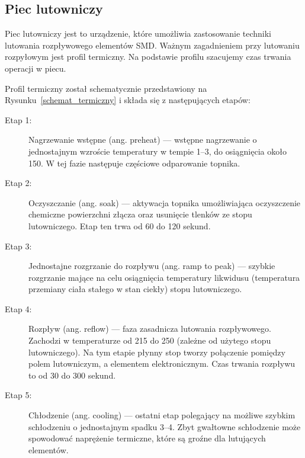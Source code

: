 \subsection{Piec lutowniczy}
Piec lutowniczy jest to urządzenie, które umożliwia zastosowanie techniki lutowania rozpływowego elementów SMD\@. Ważnym zagadnieniem przy lutowaniu rozpyłowym jest profil termiczny. Na podstawie profilu szacujemy czas trwania operacji w piecu.

\breakparagraph{}
Profil termiczny został schematycznie przedstawiony na Rysunku~\ref{schemat_termiczny} i składa się z następujących etapów:
\begin{description}
	\item[Etap 1:] Nagrzewanie wstępne (ang. preheat) --- wstępne nagrzewanie o jednostajnym wzroście temperatury w tempie 1--3, do osiągnięcia około 150. W tej fazie następuje częściowe odparowanie topnika.
	\item[Etap 2:] Oczyszczanie (ang. soak) --- aktywacja topnika umożliwiająca oczyszczenie chemiczne powierzchni złącza oraz usunięcie tlenków ze stopu lutowniczego. Etap ten trwa od 60 do 120 sekund.
	\item[Etap 3:] Jednostajne rozgrzanie do rozpływu (ang. ramp to peak) --- szybkie rozgrzanie mające na celu osiągnięcia temperatury likwidusu (temperatura przemiany ciała stałego w stan ciekły) stopu lutowniczego.
	\item[Etap 4:] Rozpływ (ang. reflow) --- faza zasadnicza lutowania rozpływowego. Zachodzi w temperaturze od 215 do 250 (zależne od użytego stopu lutowniczego). Na tym etapie płynny stop tworzy połączenie pomiędzy polem lutowniczym, a elementem elektronicznym. Czas trwania rozpływu to od 30 do 300 sekund.
	\item[Etap 5:] Chłodzenie (ang. cooling) --- ostatni etap polegający na możliwe szybkim schłodzeniu o jednostajnym spadku 3--4. Zbyt gwałtowne schłodzenie może spowodować naprężenie termiczne, które są groźne dla lutujących elementów.
\end{description}

